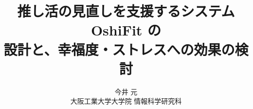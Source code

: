 \documentclass[a4paper,11pt]{ltjsreport}
\title{推し活の見直しを支援するシステム OshiFit の\\設計と、幸福度・ストレスへの効果の検討}
\author{今井 元\\大阪工業大学大学院 情報科学研究科 \todo{所属・研究室名を確認}}
\date{\todo{提出日}}
\begin{document}
\maketitle
\tableofcontents









\nocite{*}

\end{document}
